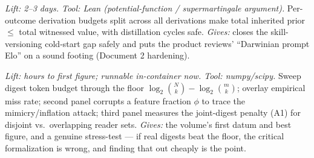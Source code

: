 \documentclass[11pt,a4paper]{article}
\begin{document}
\begin{description}[leftmargin=0em,style=unboxed]
\item[A6. No-mint reputation inheritance.] \emph{Lift: 2--3 days. Tool: Lean (potential-function / supermartingale argument).} Per-outcome derivation budgets split across all derivations make total inherited prior $\le$ total witnessed value, with distillation cycles safe. \emph{Gives:} closes the skill-versioning cold-start gap safely and puts the product reviews' ``Darwinian prompt Elo'' on a sound footing (Document 2 hardening).

\item[A7. The information-floor falsification experiment.] \emph{Lift: hours to first figure; runnable in-container now. Tool: numpy/scipy.} Sweep digest token budget through the floor $\log_2\binom{N}{k}-\log_2\binom{m}{k}$; overlay empirical miss rate; second panel corrupts a feature fraction $\phi$ to trace the mimicry/inflation attack; third panel measures the joint-digest penalty (A1) for disjoint vs.\ overlapping reader sets. \emph{Gives:} the volume's first datum and best figure, and a genuine stress-test --- if real digests beat the floor, the critical formalization is wrong, and finding that out cheaply is the point.
\end{description}
\end{document}
